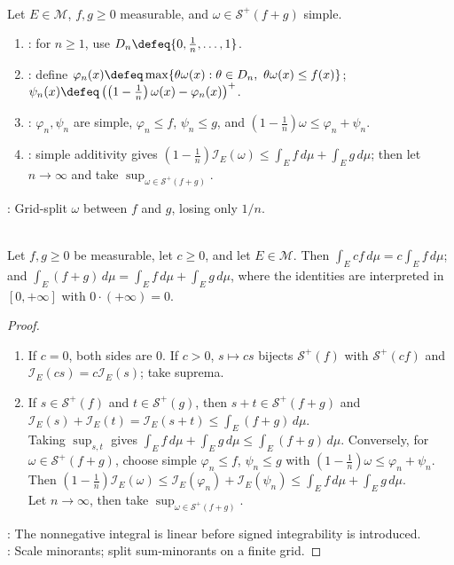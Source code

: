 \begin{method} \label{meth:splitting-simple-minorants-under-sum} \\
Let $E\in\mathcal{M}$, $f,g\geq0$ measurable, and $\omega\in\mathcal{S}^+(f+g)$ simple.
\begin{enumerate}[label=(\roman*)]
\setlength{\itemsep}{0pt}
\item {}: for $n\geq1$, use $D_n\defeq\{0,\frac1n,\ldots,1\}$.
\item {}: define $\varphi_n(x)\defeq\max\{\theta\omega(x):\theta\in D_n,\ \theta\omega(x)\leq f(x)\}$; $\psi_n(x)\defeq\left(\left(1-\frac1n\right)\omega(x)-\varphi_n(x)\right)^+$.
\item {}: $\varphi_n,\psi_n$ are simple, $\varphi_n\leq f$, $\psi_n\leq g$, and $(1-\frac1n)\omega\leq\varphi_n+\psi_n$.
\item {}: simple additivity gives $(1-\frac1n)\mathcal{I}_E(\omega)\leq\int_Ef\,d\mu+\int_Eg\,d\mu$; then let $n\to\infty$ and take $\sup_{\omega\in\mathcal{S}^+(f+g)}$.
\end{enumerate}
: Grid-split $\omega$ between $f$ and $g$, losing only $1/n$.
\end{method}

\begin{proposition} \label{prop:nonnegative-integral-homogeneity-additivity} \\
Let $f,g\geq0$ be measurable, let $c\geq0$, and let $E\in\mathcal{M}$. Then $\int_E cf\,d\mu=c\int_E f\,d\mu$; and $\int_E(f+g)\,d\mu=\int_Ef\,d\mu+\int_Eg\,d\mu$, where the identities are interpreted in $[0,+\infty]$ with $0\cdot(+\infty)=0$.
\begin{proof}
\begin{enumerate}[label=(\roman*)]
\setlength{\itemsep}{0pt}
\item If $c=0$, both sides are $0$. If $c>0$, $s\mapsto cs$ bijects $\mathcal{S}^+(f)$ with $\mathcal{S}^+(cf)$ and $\mathcal{I}_E(cs)=c\mathcal{I}_E(s)$; take suprema.
\item If $s\in\mathcal{S}^+(f)$ and $t\in\mathcal{S}^+(g)$, then $s+t\in\mathcal{S}^+(f+g)$ and $\mathcal{I}_E(s)+\mathcal{I}_E(t)=\mathcal{I}_E(s+t)\leq\int_E(f+g)\,d\mu$.\\
Taking $\sup_{s,t}$ gives $\int_Ef\,d\mu+\int_Eg\,d\mu\leq\int_E(f+g)\,d\mu$. Conversely, for $\omega\in\mathcal{S}^+(f+g)$, choose simple $\varphi_n\leq f$, $\psi_n\leq g$ with $(1-\frac1n)\omega\leq\varphi_n+\psi_n$. Then $\left(1-\frac1n\right)\mathcal{I}_E(\omega) \leq \mathcal{I}_E(\varphi_n)+\mathcal{I}_E(\psi_n) \leq \int_E f\,d\mu+\int_E g\,d\mu$.\\
Let $n\to\infty$, then take $\sup_{\omega\in\mathcal{S}^+(f+g)}$.
\end{enumerate}
: The nonnegative integral is linear before signed integrability is introduced.\\
: Scale minorants; split sum-minorants on a finite grid.
\end{proof}
\end{proposition}

